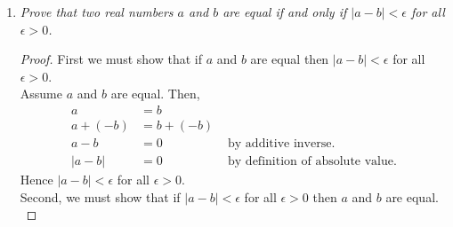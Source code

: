 \documentclass{amsart}
\begin{document}
\begin{enumerate}[1.]
\begin{proof}
We know that $c < c+1$. Since $b > 0$ 
\begin{align*}
    b\cdot c &< b\cdot(c+1) \\
    &< b\cdot d
\end{align*}
Therefore $\frac{b}{d}<\frac{b}{c}$. \\

By this method, if we are given
a positive rational number $\frac{b}{c}$ we can find another positive
rational number $\frac{b}{d}$ such that $\frac{b}{d}<\frac{b}{c}$.
Therefore $\mathbb{Q}^+$ does not have a smallest element.

\end{proof}

\newpage

\item \emph{Prove that two real numbers $a$ and $b$ are equal if and 
only if $|a - b| <\epsilon$ for all $\epsilon> 0$.}
\begin{proof}
First we must show that if $a$ and $b$ are equal then $|a - b| <\epsilon$ 
for all $\epsilon> 0$. \\

Assume $a$ and $b$ are equal. Then,
\begin{align*}
    a &= b \\
    a + (-b) &= b + (-b) \\
    a - b &= 0 &\text{ by additive inverse. } \\
    |a - b| &= 0 &\text { by definition of absolute value.}
\end{align*}
Hence $|a - b| < \epsilon$ for all $\epsilon > 0$. \\

Second, we must show that if $|a - b| < \epsilon$ for all $\epsilon > 0$
then $a$ and $b$ are equal. \\


\end{proof}
\end{enumerate}
\end{document}
